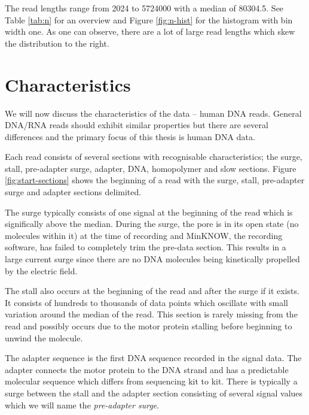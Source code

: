 


The read lengths range from 2024 to \num{5724000} with a median of 80304.5. See Table \ref{tab:n} for an overview and Figure \ref{fig:n-hist} for the histogram with bin width one. As one can observe, there are a lot of large read lengths which skew the distribution to the right.




\section{Characteristics}
\label{sec:data:char}

We will now discuss the characteristics of the data -- human DNA reads. General DNA/RNA reads should exhibit similar properties but there are several differences and the primary focus of this thesis is human DNA data.

Each read consists of several sections with recognisable characteristics; the surge, stall, pre-adapter surge, adapter, DNA, homopolymer and slow sections. Figure \ref{fig:start-sections} shows the beginning of a read with the surge, stall, pre-adapter surge and adapter sections delimited.

The surge typically consists of one signal at the beginning of the read which is significally above the median. During the surge, the pore is in its open state (no molecules within it) at the time of recording and MinKNOW, the recording software, has failed to completely trim the pre-data section. This results in a large current surge since there are no DNA molecules being kinetically propelled by the electric field.

The stall also occurs at the beginning of the read and after the surge if it exists. It consists of hundreds to thousands of data points which oscillate with small variation around the median of the read. This section is rarely missing from the read and possibly occurs due to the motor protein stalling before beginning to unwind the molecule.

The adapter sequence is the first DNA sequence recorded in the signal data. The adapter connects the motor protein to the DNA strand and has a predictable molecular sequence which differs from sequencing kit to kit. There is typically a surge between the stall and the adapter section consisting of several signal values which we will name the \textit{pre-adapter surge}.

